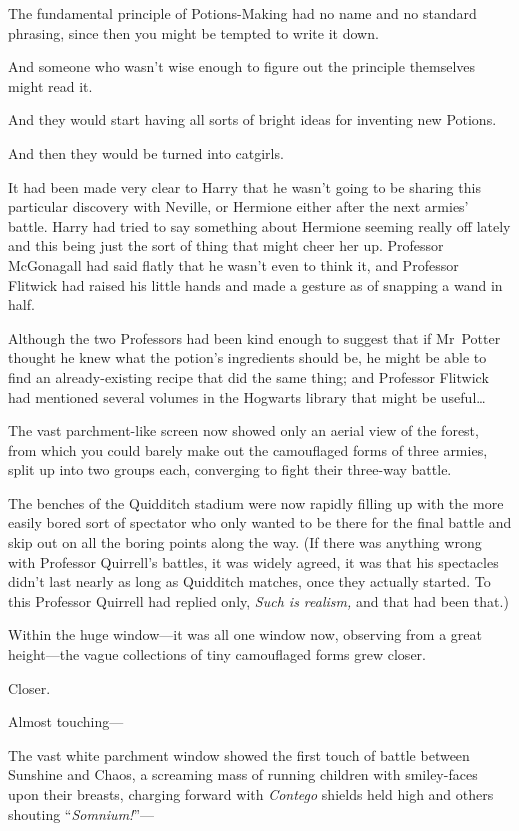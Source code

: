The fundamental principle of Potions-Making had no name and no standard phrasing, since then you might be tempted to write it down.

And someone who wasn’t wise enough to figure out the principle themselves might read it.

And they would start having all sorts of bright ideas for inventing new Potions.

And then they would be turned into catgirls.

It had been made very clear to Harry that he wasn’t going to be sharing this particular discovery with Neville, or Hermione either after the next armies’ battle. Harry had tried to say something about Hermione seeming really off lately and this being just the sort of thing that might cheer her up. Professor McGonagall had said flatly that he wasn’t even to think it, and Professor Flitwick had raised his little hands and made a gesture as of snapping a wand in half.

Although the two Professors had been kind enough to suggest that if Mr~Potter thought he knew what the potion’s ingredients should be, he might be able to find an already-existing recipe that did the same thing; and Professor Flitwick had mentioned several volumes in the Hogwarts library that might be useful…

\later

The vast parchment-like screen now showed only an aerial view of the forest, from which you could barely make out the camouflaged forms of three armies, split up into two groups each, converging to fight their three-way battle.

The benches of the Quidditch stadium were now rapidly filling up with the more easily bored sort of spectator who only wanted to be there for the final battle and skip out on all the boring points along the way. (If there was anything wrong with Professor Quirrell’s battles, it was widely agreed, it was that his spectacles didn’t last nearly as long as Quidditch matches, once they actually started. To this Professor Quirrell had replied only, \emph{Such is realism,} and that had been that.)

Within the huge window—it was all one window now, observing from a great height—the vague collections of tiny camouflaged forms grew closer.

Closer.

Almost touching—

\later

The vast white parchment window showed the first touch of battle between Sunshine and Chaos, a screaming mass of running children with smiley-faces upon their breasts, charging forward with \emph{Contego} shields held high and others shouting “\emph{Somnium!}”—

